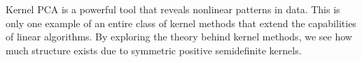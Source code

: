 Kernel PCA is a powerful tool that reveals nonlinear patterns in data.
This is only one example of an entire class of kernel methods that extend the capabilities of linear algorithms.
By exploring the theory behind kernel methods, we see how much structure exists due to symmetric positive semidefinite kernels.